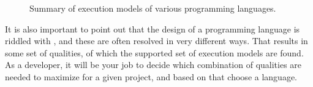 \begin{figure}[tbp]
  
  \caption{Summary of execution models of various programming languages.}
  \label{fig:first:phases:summary}
\end{figure}

It is also important to point out that the design of a programming language is riddled with , and these are often resolved in very different ways. That results in some set of qualities, of which the supported set of execution models are found. As a developer, it will be your job to decide which combination of qualities are needed to maximize  for a given project, and based on that choose a language.


